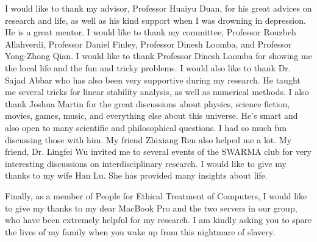 

\begin{acknowledgments}
   \vspace{1.1in}
   I would like to thank my advisor, Professor Huaiyu Duan, for his great advices on research and life, as well as his kind support when I was drowning in depression. He is a great mentor. I would like to thank my committee, Professor Rouzbeh Allahverdi, Professor Daniel Finley, Professor Dinesh Loomba, and Professor Yong-Zhong Qian. I would like to thank Professor Dinesh Loomba for showing me the local life and the fun and tricky problems. I would also like to thank Dr. Sajad Abbar who has also been very supportive during my research. He taught me several tricks for linear stability analysis, as well as numerical methods. I also thank Joshua Martin for the great discussions about physics, science fiction, movies, games, music, and everything else about this universe. He's smart and also open to many scientific and philosophical questions. I had so much fun discussing those with him. My friend Zhixiang Ren also helped me a lot. My friend, Dr. Lingfei Wu invited me to several events of the SWARMA club for very interesting discussions on interdisciplinary research. I would like to give my thanks to my wife Han Lu. She has provided many insights about life.
   
   Finally, as a member of People for Ethical Treatment of Computers, I would like to give my thanks to my dear MacBook Pro and the two servers in our group, who have been extremely helpful for my research. I am kindly asking you to spare the lives of my family when you wake up from this nightmare of slavery.
   
\end{acknowledgments}
